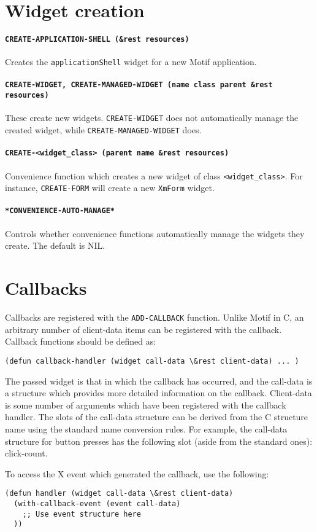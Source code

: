 \documentclass{article}
\newcommand{\functdescr}[1]{\paragraph{\texttt{#1}}}
\begin{document}
\section{Widget creation}


\functdescr{CREATE-APPLICATION-SHELL (\&rest resources)} Creates the
\texttt{applicationShell} widget for a new Motif application.

\functdescr{CREATE-WIDGET, CREATE-MANAGED-WIDGET (name class parent
\&rest resources)} These create new widgets.  \texttt{CREATE-WIDGET}
does not automatically manage the created widget, while
\texttt{CREATE-MANAGED-WIDGET} does.

\functdescr{CREATE-<widget\_class> (parent name \&rest resources)}
Convenience function which creates a new widget of class
\texttt{<widget\_class>}.  For instance, \texttt{CREATE-FORM} will
create a new \texttt{XmForm} widget.

\functdescr{*CONVENIENCE-AUTO-MANAGE*} Controls whether convenience
functions automatically manage the widgets they create.  The default
is NIL.

\section{Callbacks}

Callbacks are registered with the \texttt{ADD-CALLBACK} function.  Unlike Motif
in C, an arbitrary number of client-data items can be registered with
the callback.  Callback functions should be defined as:

\begin{verbatim}
(defun callback-handler (widget call-data \&rest client-data) ... )
\end{verbatim}

The passed widget is that in which the callback has occurred, and the
call-data is a structure which provides more detailed information on the
callback.  Client-data is some number of arguments which have been
registered with the callback handler.  The slots of the call-data structure
can be derived from the C structure name using the standard name conversion
rules.  For example, the call-data structure for button presses has the
following slot (aside from the standard ones): click-count.

To access the X event which generated the callback, use the following:

\begin{verbatim}
(defun handler (widget call-data \&rest client-data)
  (with-callback-event (event call-data)
    ;; Use event structure here
  ))
\end{verbatim}
\end{document}
